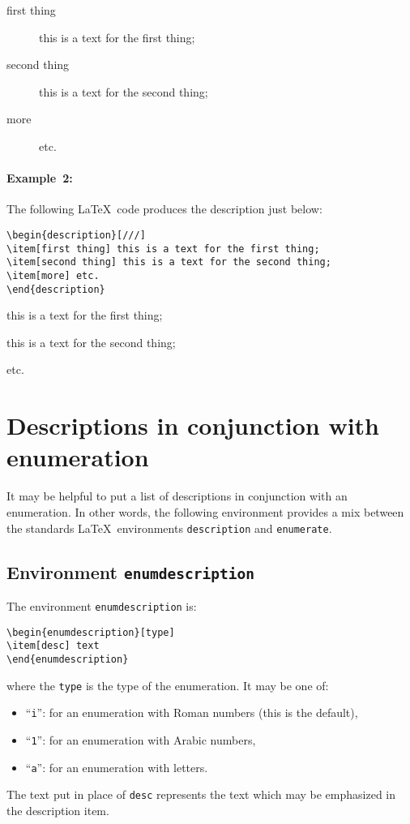 \documentclass[book]{upmethodology-document}
\begin{document}
\begin{description}
\item[first thing] this is a text for the first thing;
\item[second thing] this is a text for the second thing;
\item[more] etc.
\end{description}

\paragraph{Example~2:} The following \LaTeX~code produces the description just below:
\begin{verbatim}
\begin{description}[///]
\item[first thing] this is a text for the first thing;
\item[second thing] this is a text for the second thing;
\item[more] etc.
\end{description}
\end{verbatim}

\begin{description}[///]
\item[first thing] this is a text for the first thing;
\item[second thing] this is a text for the second thing;
\item[more] etc.
\end{description}

\section{Descriptions in conjunction with enumeration}

It may be helpful to put a list of descriptions in conjunction with an enumeration.
In other words, the following environment provides a mix between the standards \LaTeX~environments \texttt{description} and \texttt{enumerate}.

\subsection{Environment \texttt{enumdescription}}

The environment \texttt{enumdescription} is:
\begin{verbatim}
\begin{enumdescription}[type]
\item[desc] text
\end{enumdescription}
\end{verbatim}
where the \texttt{type} is the type of the enumeration. It may be one of:
\begin{itemize}
\item ``\texttt{i}'': for an enumeration with Roman numbers (this is the default),
\item ``\texttt{1}'': for an enumeration with Arabic numbers,
\item ``\texttt{a}'': for an enumeration with letters.
\end{itemize}
The text put in place of \texttt{desc} represents the text which may be emphasized in the description item.
\end{document}
